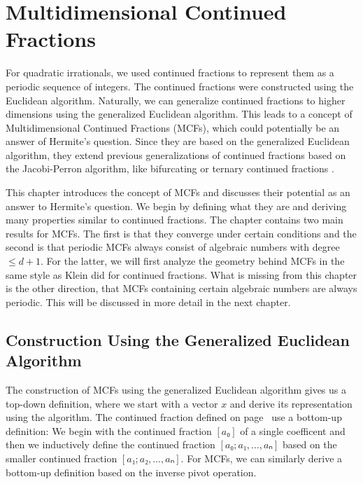 \chapter{Multidimensional Continued Fractions}
\label{ch:mdcf}

For quadratic irrationals, we used continued fractions to represent them as a
periodic sequence of integers.
The continued fractions were constructed using the Euclidean algorithm.
Naturally, we can generalize continued fractions to higher dimensions using the
generalized Euclidean algorithm.
This leads to a concept of Multidimensional Continued Fractions (MCFs), which could
potentially be an answer of Hermite's question.
Since they are based on the generalized Euclidean algorithm,
they extend previous generalizations of continued fractions based on the
Jacobi-Perron algorithm, like bifurcating or ternary continued fractions \cite{Gupta00}.

This chapter introduces the concept of MCFs and discusses their potential as
an answer to Hermite's question.
We begin by defining what they are and deriving many properties similar to
continued fractions.
The chapter contains two main results for MCFs.
The first is that they converge under certain conditions
and the second is that periodic MCFs always consist of algebraic numbers with degree $≤ d+1$.
For the latter, we will first analyze the geometry behind MCFs in the same
style as Klein did for continued fractions.
What is missing from this chapter is the other direction,
that MCFs containing certain algebraic numbers are always periodic.
This will be discussed in more detail in the next chapter.

\section{Construction Using the Generalized Euclidean Algorithm}

The construction of MCFs using the generalized Euclidean algorithm gives us a
top-down definition, where we start with a vector $x$ and derive its
representation using the algorithm.
The continued fraction defined on page~\pageref{def:cont-frac}
use a bottom-up definition:
We begin with the continued fraction $[a₀]$ of a single coefficent
and then we inductively define the continued fraction $[a₀; a₁, …, aₙ]$
based on the smaller continued fraction $[a₁; a₂, …, aₙ]$.
For MCFs, we can similarly derive a bottom-up definition based on the inverse
pivot operation.

